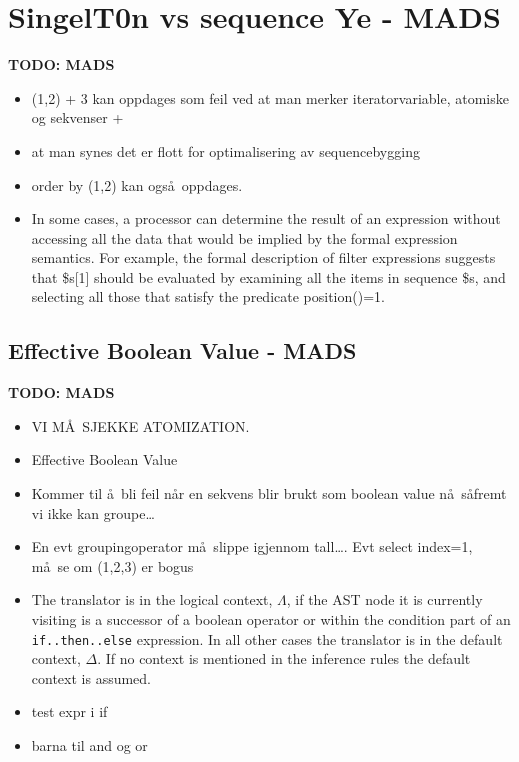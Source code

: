 \section{SingelT0n vs sequence Ye - {MADS}}
\label{sect:disc:singelton}
\textbf{\LARGE TODO: {MADS}}
\begin{itemize}
   \item (1,2) + 3 kan oppdages som feil ved at man merker iteratorvariable, atomiske og sekvenser + 
   \item at man synes det er flott for optimalisering av sequencebygging 
   \item order by (1,2) kan ogs\aa~oppdages. 
   \item In some cases, a processor can determine the result of an expression without accessing all the data that
   would be implied by the formal expression semantics. For example, the formal description of filter expressions
   suggests that \$s[1] should be evaluated by examining all the items in sequence \$s, and selecting all those
   that satisfy the predicate position()=1.
\end{itemize}


\subsection{Effective Boolean Value - {MADS}}
\label{sect:disc:effBool}
\textbf{\LARGE TODO: {MADS}}
\begin{itemize}
\item VI M\AA~SJEKKE ATOMIZATION.
\item Effective Boolean Value
\item Kommer til \aa~bli feil n\aa r en sekvens blir brukt som boolean value n\aa~s\aa fremt vi ikke kan groupe\ldots
\item En evt groupingoperator m\aa~slippe igjennom tall\ldots. Evt select index=1, m\aa~se om (1,2,3) er bogus
\item The translator is in the logical context, $\Lambda$, if the AST node it is currently visiting is a successor
of a boolean operator or within the condition part of an \texttt{if..then..else} expression. In all other cases the
translator is in the default context, $\Delta$. If no context is mentioned in the inference rules the default
context is assumed. 
\item test expr i if
\item barna til and og or
\end{itemize}